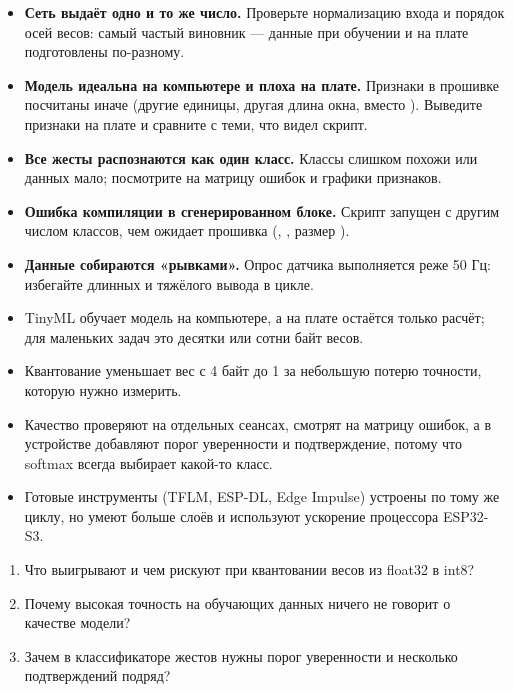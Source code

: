 \begin{trouble}
\begin{itemize}[leftmargin=*]
  \item \textbf{Сеть выдаёт одно и то же число.} Проверьте нормализацию входа и порядок осей весов:
        самый частый виновник --- данные при обучении и на плате подготовлены по-разному.
  \item \textbf{Модель идеальна на компьютере и плоха на плате.} Признаки в прошивке посчитаны иначе
        (другие единицы, другая длина окна,  вместо ). Выведите признаки на плате и
        сравните с теми, что видел скрипт.
  \item \textbf{Все жесты распознаются как один класс.} Классы слишком похожи или данных мало; посмотрите
        на матрицу ошибок и графики признаков.
  \item \textbf{Ошибка компиляции в сгенерированном блоке.} Скрипт запущен с другим числом классов, чем
        ожидает прошивка (, , размер ).
  \item \textbf{Данные собираются «рывками».} Опрос датчика выполняется реже 50 Гц: избегайте длинных
         и тяжёлого вывода в цикле.
\end{itemize}
\end{trouble}

\begin{summary}
\begin{itemize}[leftmargin=*]
  \item TinyML обучает модель на компьютере, а на плате остаётся только расчёт; для маленьких задач это
        десятки или сотни байт весов.
  \item Квантование уменьшает вес с 4 байт до 1 за небольшую потерю точности, которую нужно измерить.
  \item Качество проверяют на отдельных сеансах, смотрят на матрицу ошибок, а в устройстве добавляют порог
        уверенности и подтверждение, потому что softmax всегда выбирает какой-то класс.
  \item Готовые инструменты (TFLM, ESP-DL, Edge Impulse) устроены по тому же циклу, но умеют больше
        слоёв и используют ускорение процессора ESP32-S3.
\end{itemize}
\end{summary}

\begin{selfcheck}
\begin{enumerate}
  \item Что выигрывают и чем рискуют при квантовании весов из float32 в int8?
  \item Почему высокая точность на обучающих данных ничего не говорит о качестве модели?
  \item Зачем в классификаторе жестов нужны порог уверенности и несколько подтверждений подряд?
\end{enumerate}
\end{selfcheck}


